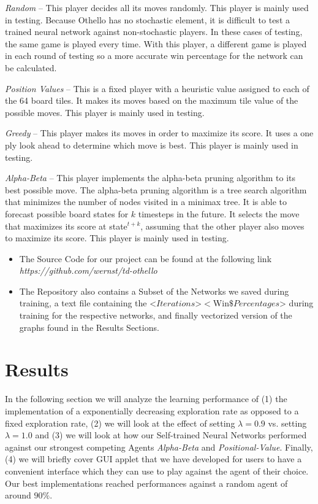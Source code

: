 \documentclass{sig-alternate-05-2015}
\begin{document}
\emph{Random} -- This player decides all its moves randomly. This player is mainly used in testing. Because Othello has no stochastic element, it is difficult to test a trained neural network against non-stochastic players. In these cases of testing, the same game is played every time. With this player, a different game is played in each round of testing so a more accurate win percentage for the network can be calculated.

\emph{Position Values} -- This is a fixed player with a heuristic value assigned to each of the 64 board tiles. It makes its moves based on the maximum tile value of the possible moves. This player is mainly used in testing.

\emph{Greedy} -- This player makes its moves in order to maximize its score. It uses a one ply look ahead to determine which move is best. This player is mainly used in testing.

\emph{Alpha-Beta} -- This player implements the alpha-beta pruning algorithm to its best possible move. The alpha-beta pruning algorithm is a tree search algorithm that minimizes the number of nodes visited in a minimax tree. It is able to forecast possible board states for $k$ timesteps in the future. It selects the move that maximizes its score at state$^{t+k}$, assuming that the other player also moves to maximize its score. This player is mainly used in testing.


\begin{itemize}

\item The Source Code for our project can be found at the following link \emph{https://github.com/wernst/td-othello}
\item The Repository also contains a Subset of the Networks we saved during training, a text file containing the <$Iterations$>$<$Win$ \$Percentages$>  during training for the respective networks, and finally vectorized version of the graphs found in the Results Sections. 

\end{itemize}

\section{Results}
	In the following section we will analyze the learning performance of (1) the implementation of a exponentially decreasing exploration rate as opposed to a fixed exploration rate, (2) we will look at the effect of setting $\lambda = 0.9$ vs. setting $\lambda = 1.0$ and (3) we will look at how our Self-trained Neural Networks performed against our strongest competing Agents \emph{Alpha-Beta} and \emph{Positional-Value}. Finally, (4) we will briefly cover GUI applet that we have developed for users to have a convenient interface which they can use to play against the agent of their choice. Our best implementations reached performances against a random agent of around $90\%$.
\end{document}
